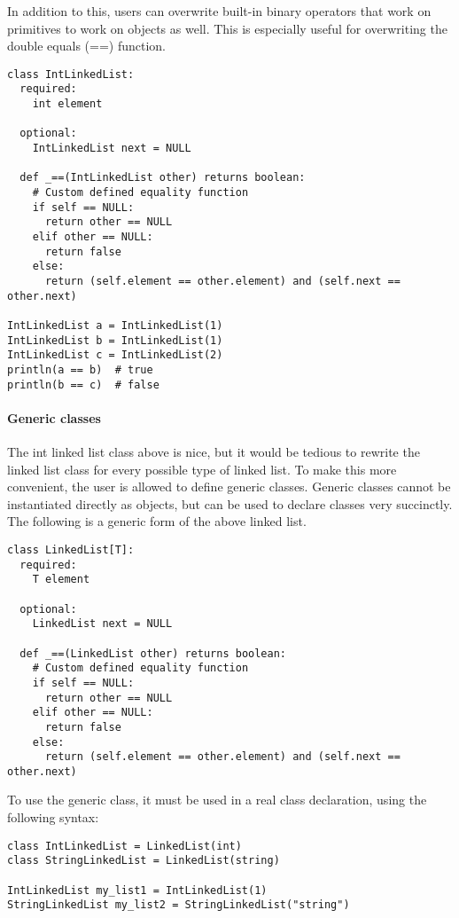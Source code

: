 \documentclass{article}
\begin{document}
In addition to this, users can overwrite built-in binary operators that work on primitives to work on objects as well. This is especially useful for overwriting the double equals (==) function.
\begin{verbatim}
class IntLinkedList:
  required:
    int element

  optional:
    IntLinkedList next = NULL

  def _==(IntLinkedList other) returns boolean:
    # Custom defined equality function
    if self == NULL:
      return other == NULL
    elif other == NULL:
      return false
    else:
      return (self.element == other.element) and (self.next == other.next)

IntLinkedList a = IntLinkedList(1)
IntLinkedList b = IntLinkedList(1)
IntLinkedList c = IntLinkedList(2)
println(a == b)  # true
println(b == c)  # false
\end{verbatim}

\paragraph{Generic classes}
The int linked list class above is nice, but it would be tedious to rewrite the linked list class for every possible type of linked list. To make this more convenient, the user is allowed to define generic classes. Generic classes cannot be instantiated directly as objects, but can be used to declare classes very succinctly. The following is a generic form of the above linked list.

\begin{verbatim}
class LinkedList[T]:
  required:
    T element

  optional:
    LinkedList next = NULL
    
  def _==(LinkedList other) returns boolean:
    # Custom defined equality function
    if self == NULL:
      return other == NULL
    elif other == NULL:
      return false
    else:
      return (self.element == other.element) and (self.next == other.next)
\end{verbatim}

To use the generic class, it must be used in a real class declaration, using the following syntax:
\begin{verbatim}
class IntLinkedList = LinkedList(int)
class StringLinkedList = LinkedList(string)

IntLinkedList my_list1 = IntLinkedList(1)
StringLinkedList my_list2 = StringLinkedList("string")
\end{verbatim}
\end{document}
